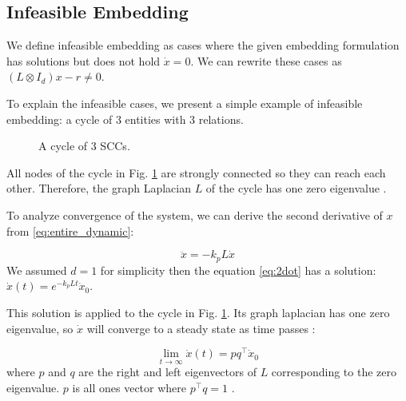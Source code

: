 \documentclass[letterpaper, 10 pt, conference]{ieeeconf}  %
\begin{document}
\subsection{Infeasible Embedding}
We define infeasible embedding as cases where the given embedding formulation has solutions but does not hold \(\dot{x} = 0\). We can rewrite these cases as \((L \otimes I_d)x - r \neq 0\).

To explain the infeasible cases, we present a simple example of infeasible embedding: a cycle of 3 entities with 3 relations.

\begin{figure}[h]
\centering
{}
\caption{A cycle of 3 SCCs.}
\label{fig:cycle}
\end{figure}

All nodes of the cycle in Fig. \ref{fig:cycle} are strongly connected so they can reach each other. Therefore, the graph Laplacian \(L \) of the cycle has one zero eigenvalue \cite{olfati-saber_consensus_2007}.

To analyze convergence of the system, we can derive the second derivative of \(x\) from \eqref{eq:entire_dynamic}:

\begin{equation}\label{eq:2dot}
    \ddot{x} = -k_p L \dot{x}
\end{equation}
\noindent We assumed \(d = 1\) for simplicity then the equation \eqref{eq:2dot} has a solution: \( \dot{x}(t) = e^{-k_p Lt} \dot{x}_0 \). 

This solution is applied to the cycle in Fig. \ref{fig:cycle}. Its graph laplacian has one zero eigenvalue, so \(\dot{x}\) will converge to a steady state as time passes \cite{mirzaev_laplacian_2013}:

\begin{equation}\label{eq:pqx0}
    \lim_{t \to \infty} \dot{x}(t) = pq^\top \dot{x}_0
\end{equation}
\noindent where \( p \) and \( q \) are the right and left eigenvectors of \(L\) corresponding to the zero eigenvalue. \(p\) is all ones vector where \(p^\top q = 1\) \cite{olfati-saber_consensus_2007}. 
\end{document}
